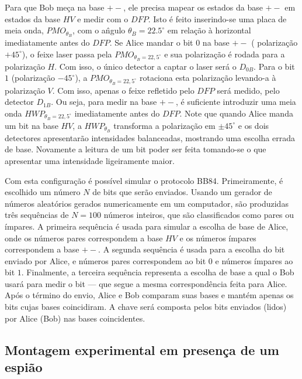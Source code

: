 \documentclass[pra, twocolumn]{revtex4}
\begin{document}
Para que Bob me\c ca na base $+-$, ele precisa mapear os estados da base $+-$ em estados da base $HV$ e medir com o $DFP$. Isto \'e feito inserindo-se uma placa de meia onda, $PMO_{\theta_B}$, com o a\^ngulo $\theta_B =22.5^\circ$ em rela\c c\~ao \`a horizontal imediatamente antes do $DFP$. Se Alice mandar o bit $0$ na base $+-$ ( polariza\c c\~ao $+ 45^\circ$), o feixe laser passa pela $PMO_{\theta_B=22,5^\circ}$ e sua polariza\c c\~ao \'e rodada para a polariza\c c\~ao $H$. Com isso, o \'unico detector a captar o laser ser\'a o $D_{0B}$. Para o bit $1$ (polariza\c c\~ao $-45^\circ$), a $PMO_{\theta_B=22,5^\circ}$ rotaciona esta polariza\c c\~ao levando-a \`a polariza\c c\~ao $V$. Com isso, apenas o feixe refletido pelo $DFP$ ser\'a medido, pelo detector $D_{1B}$. Ou seja, para medir na base $+-$, \'e suficiente introduzir uma meia onda $HWP_{\theta_B=22,5^\circ}$ imediatamente antes do $DFP$. Note que quando Alice manda um bit na base $HV$, a $HWP_{\theta_B}$ transforma a polariza\c c\~ao em $\pm 45^\circ$ e os dois detectores apresentar\~ao intensidades balanceadas, mostrando uma escolha errada de base. Novamente a leitura de um bit poder ser feita tomando-se o que apresentar uma intensidade ligeiramente maior.

Com esta configura\c c\~ao \'e poss\'ivel simular o protocolo BB84. Primeiramente, \'e escolhido um n\'umero $N$ de bits que ser\~ao enviados. Usando um gerador de n\'umeros aleat\'orios gerados numericamente em um computador, s\~ao produzidas tr\^es sequ\^encias de $N=100$ n\'umeros inteiros, que s\~ao classificados como pares ou \'impares. A primeira sequ\^encia \'e usada para simular a escolha de base de Alice, onde os n\'umeros pares correspondem a base $HV$ e os n\'umeros \'impares correspondem a base $+-$. A segunda sequ\^encia \'e usada para a escolha do bit enviado por Alice, e n\'umeros pares correspondem ao bit $0$ e n\'umeros \'impares ao bit $1$. Finalmente, a terceira sequ\^encia representa a escolha de base a qual o Bob usar\'a para medir o bit --- que segue a mesma correspond\^encia feita para Alice. Ap\'os o t\'ermino do envio, Alice e Bob comparam suas bases e mant\'em apenas os bits cujas bases coincidiram. A chave ser\'a composta pelos bits enviados (lidos) por Alice (Bob) nas bases coincidentes. 






\subsection{Montagem experimental em presen\c ca de um espi\~ao}
\label{comEva}
\end{document}
